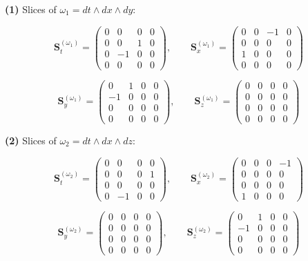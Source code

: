 \textbf{(1)} Slices of \(\omega_1 = dt\wedge dx\wedge dy\):

\[
\mathbf{S}_{t}^{(\omega_1)}=\begin{pmatrix}0&0&0&0\\[2pt]0&0&1&0\\[2pt]0&-1&0&0\\[2pt]0&0&0&0\end{pmatrix},\qquad
\mathbf{S}_{x}^{(\omega_1)}=\begin{pmatrix}0&0&-1&0\\[2pt]0&0&0&0\\[2pt]1&0&0&0\\[2pt]0&0&0&0\end{pmatrix}
\]

\[
\mathbf{S}_{y}^{(\omega_1)}=\begin{pmatrix}0&1&0&0\\[2pt]-1&0&0&0\\[2pt]0&0&0&0\\[2pt]0&0&0&0\end{pmatrix},\qquad
\mathbf{S}_{z}^{(\omega_1)}=\begin{pmatrix}0&0&0&0\\[2pt]0&0&0&0\\[2pt]0&0&0&0\\[2pt]0&0&0&0\end{pmatrix}
\]

\textbf{(2)} Slices of \(\omega_2 = dt\wedge dx\wedge dz\):

\[
\mathbf{S}_{t}^{(\omega_2)}=\begin{pmatrix}0&0&0&0\\[2pt]0&0&0&1\\[2pt]0&0&0&0\\[2pt]0&-1&0&0\end{pmatrix},\qquad
\mathbf{S}_{x}^{(\omega_2)}=\begin{pmatrix}0&0&0&-1\\[2pt]0&0&0&0\\[2pt]0&0&0&0\\[2pt]1&0&0&0\end{pmatrix}
\]

\[
\mathbf{S}_{y}^{(\omega_2)}=\begin{pmatrix}0&0&0&0\\[2pt]0&0&0&0\\[2pt]0&0&0&0\\[2pt]0&0&0&0\end{pmatrix},\qquad
\mathbf{S}_{z}^{(\omega_2)}=\begin{pmatrix}0&1&0&0\\[2pt]-1&0&0&0\\[2pt]0&0&0&0\\[2pt]0&0&0&0\end{pmatrix}
\]


